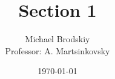 


\title{Section 1}
\date{\today}
\author{Michael Brodskiy\\ \small Professor: A. Martsinkovsky}



\maketitle

